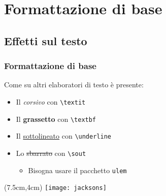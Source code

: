 \section{Formattazione di base}
\subsection{Effetti sul testo}
\begin{frame}
 \frametitle{Formattazione di base}
 
 Come su altri elaboratori di testo è presente:
 \begin{itemize}
  \item<1-> Il \textit{corsivo} con \texttt{\textbackslash textit}
  \item<2-> Il \textbf{grassetto} con \texttt{\textbackslash textbf}
  \item<3-> Il \underline{sottolineato} con \texttt{\textbackslash underline}
  \item<4-> Lo \sout{sbarrato} con \texttt{\textbackslash sout}
  \begin{itemize}
   \item Bisogna usare il pacchetto \texttt{ulem}
  \end{itemize}

 \end{itemize}
 
 \begin{textblock*}{5cm}(7.5cm,4cm)
   \texttt{[image: jacksons]}
 \end{textblock*}
\end{frame}
